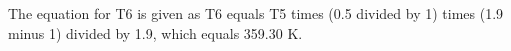 The equation for T6 is given as T6 equals T5 times (0.5 divided by 1) times (1.9 minus 1) divided by 1.9, which equals 359.30 K.